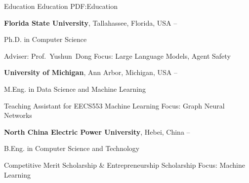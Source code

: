\Section
{Education}
{Education}
{PDF:Education}

\Entry
{\textbf{Florida State University}},
Tallahassee, Florida, USA
\hfill
{} --

\Gap
\BulletItem
Ph.D. in
{Computer Science}
\begin{Detail}
\SubBulletItem
Adviser:
Prof.~Yushun~Dong
\SubBulletItem
Focus:
Large Language Models, Agent Safety
\end{Detail}

\BigGap
\Entry
{\textbf{University of Michigan}},
Ann Arbor, Michigan, USA
\hfill
{} --

\Gap
\BulletItem
M.Eng. in
{Data Science and Machine Learning}
\begin{Detail}
\SubBulletItem
Teaching Assistant for EECS553 Machine Learning
\SubBulletItem
Focus: Graph Neural Networks
\end{Detail}

\BigGap
\Entry
{\textbf{North China Electric Power University}},
Hebei, China
\hfill
{} --

\Gap
\BulletItem
B.Eng. in
{Computer Science and Technology}
\begin{Detail}
\SubBulletItem
Competitive Merit Scholarship \& Entrepreneurship Scholarship
\SubBulletItem
Focus: Machine Learning
\end{Detail}

